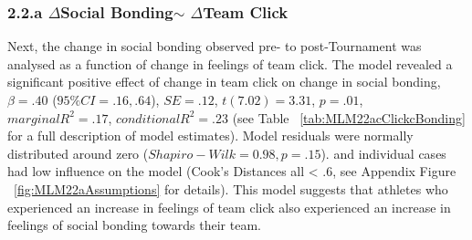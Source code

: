 \subsubsection{2.2.a $\Delta$Social Bonding$\sim$ $\Delta$Team Click}
Next, the change in social bonding observed pre- to post-Tournament was analysed as a function of change in feelings of team click.  The model revealed a significant positive effect of change in team click on change in social bonding, $\beta = .40$ ($95\% CI =  .16, .64$), $SE = .12$, $t(7.02) = 3.31$, $p = .01$, $marginal R^2 = .17$, $conditional R^2 = .23$ (see Table ~\ref{tab:MLM22acClickcBonding} for a full description of model estimates).  Model residuals were normally distributed around zero ($Shapiro-Wilk = 0.98, p = .15$). and individual cases had low influence on the model (Cook's Distances all < .6, see Appendix Figure ~\ref{fig:MLM22aAssumptions} for details). This model suggests that athletes who experienced an increase in feelings of team click also experienced an increase in feelings of social bonding towards their team.











